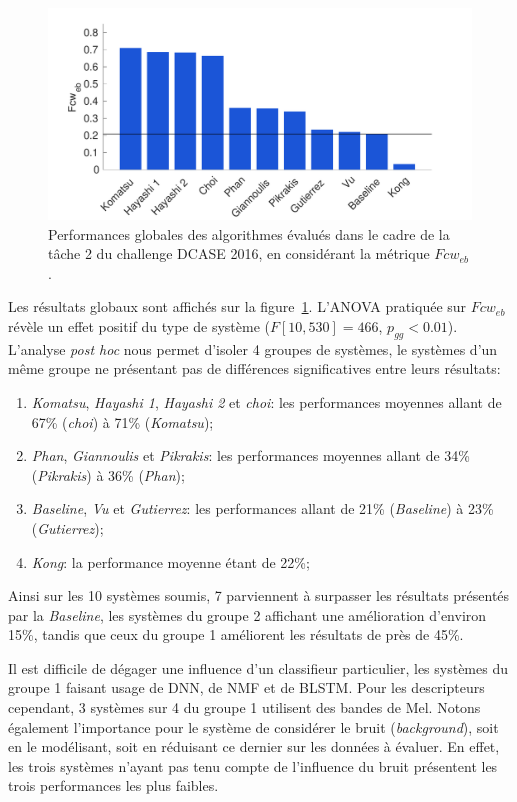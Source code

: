 \begin{figure}[t]
\includegraphics[width=1\textwidth]{gfx/ch_7/results_overall_eb_class_wise_average_F_6}
\caption{Performances globales des algorithmes évalués dans le cadre de la tâche 2 du challenge DCASE 2016, en considérant la métrique $Fcw_{eb}$.}
\label{fig:overall_eb_class_wise_F}
\end{figure}

Les résultats globaux sont affichés sur la figure~\ref{fig:overall_eb_class_wise_F}. L'ANOVA pratiquée sur $Fcw_{eb}$ révèle un effet positif du type de système ($F[10,530]=466$, $p_{gg}<0.01$). L'analyse \emph{post hoc} nous permet d'isoler 4 groupes de systèmes, le systèmes d'un même groupe ne présentant pas de différences significatives entre leurs résultats:

\begin{enumerate}
\item \emph{Komatsu}, \emph{Hayashi 1}, \emph{Hayashi 2} et \emph{choi}: les performances moyennes allant de 67\% (\emph{choi}) à 71\% (\emph{Komatsu});
\item \emph{Phan}, \emph{Giannoulis} et \emph{Pikrakis}: les performances moyennes allant de 34\% (\emph{Pikrakis}) à 36\% (\emph{Phan});
\item \emph{Baseline}, \emph{Vu} et \emph{Gutierrez}: les performances allant de 21\% (\emph{Baseline}) à 23\% (\emph{Gutierrez});
\item \emph{Kong}: la performance moyenne étant de 22\%;
\end{enumerate}

Ainsi sur les 10 systèmes soumis, 7 parviennent à surpasser les résultats présentés par la \emph{Baseline}, les systèmes du groupe 2 affichant une amélioration d'environ 15\%, tandis que ceux du groupe 1 améliorent les résultats de près de 45\%.

Il est difficile de dégager une influence d'un classifieur particulier, les systèmes du groupe 1 faisant usage de DNN, de NMF et de BLSTM. Pour les descripteurs cependant, 3 systèmes sur 4 du groupe 1 utilisent des bandes de Mel. Notons également l'importance pour le système de considérer le bruit (\emph{background}), soit en le modélisant, soit en réduisant ce dernier sur les données à évaluer. En effet, les trois systèmes n'ayant pas tenu compte de l'influence du bruit présentent les trois performances les plus faibles.

